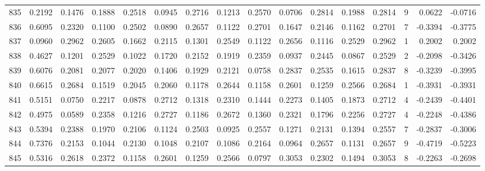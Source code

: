 \begin{tabular}{lrrrrrrrrrrrrrrr}
835 &      0.2192 &  0.1476 &  0.1888 &  0.2518 &  0.0945 &  0.2716 &  0.1213 &  0.2570 &  0.0706 &  0.2814 &   0.1988 &     0.2814 &      9 &                    0.0622 &                    -0.0716 \\
836 &      0.6095 &  0.2320 &  0.1100 &  0.2502 &  0.0890 &  0.2657 &  0.1122 &  0.2701 &  0.1647 &  0.2146 &   0.1162 &     0.2701 &      7 &                   -0.3394 &                    -0.3775 \\
837 &      0.0960 &  0.2962 &  0.2605 &  0.1662 &  0.2115 &  0.1301 &  0.2549 &  0.1122 &  0.2656 &  0.1116 &   0.2529 &     0.2962 &      1 &                    0.2002 &                     0.2002 \\
838 &      0.4627 &  0.1201 &  0.2529 &  0.1022 &  0.1720 &  0.2152 &  0.1919 &  0.2359 &  0.0937 &  0.2445 &   0.0867 &     0.2529 &      2 &                   -0.2098 &                    -0.3426 \\
839 &      0.6076 &  0.2081 &  0.2077 &  0.2020 &  0.1406 &  0.1929 &  0.2121 &  0.0758 &  0.2837 &  0.2535 &   0.1615 &     0.2837 &      8 &                   -0.3239 &                    -0.3995 \\
840 &      0.6615 &  0.2684 &  0.1519 &  0.2045 &  0.2060 &  0.1178 &  0.2644 &  0.1158 &  0.2601 &  0.1259 &   0.2566 &     0.2684 &      1 &                   -0.3931 &                    -0.3931 \\
841 &      0.5151 &  0.0750 &  0.2217 &  0.0878 &  0.2712 &  0.1318 &  0.2310 &  0.1444 &  0.2273 &  0.1405 &   0.1873 &     0.2712 &      4 &                   -0.2439 &                    -0.4401 \\
842 &      0.4975 &  0.0589 &  0.2358 &  0.1216 &  0.2727 &  0.1186 &  0.2672 &  0.1360 &  0.2321 &  0.1796 &   0.2256 &     0.2727 &      4 &                   -0.2248 &                    -0.4386 \\
843 &      0.5394 &  0.2388 &  0.1970 &  0.2106 &  0.1124 &  0.2503 &  0.0925 &  0.2557 &  0.1271 &  0.2131 &   0.1394 &     0.2557 &      7 &                   -0.2837 &                    -0.3006 \\
844 &      0.7376 &  0.2153 &  0.1044 &  0.2130 &  0.1048 &  0.2107 &  0.1086 &  0.2164 &  0.0964 &  0.2657 &   0.1131 &     0.2657 &      9 &                   -0.4719 &                    -0.5223 \\
845 &      0.5316 &  0.2618 &  0.2372 &  0.1158 &  0.2601 &  0.1259 &  0.2566 &  0.0797 &  0.3053 &  0.2302 &   0.1494 &     0.3053 &      8 &                   -0.2263 &                    -0.2698 \\

\end{tabular}

